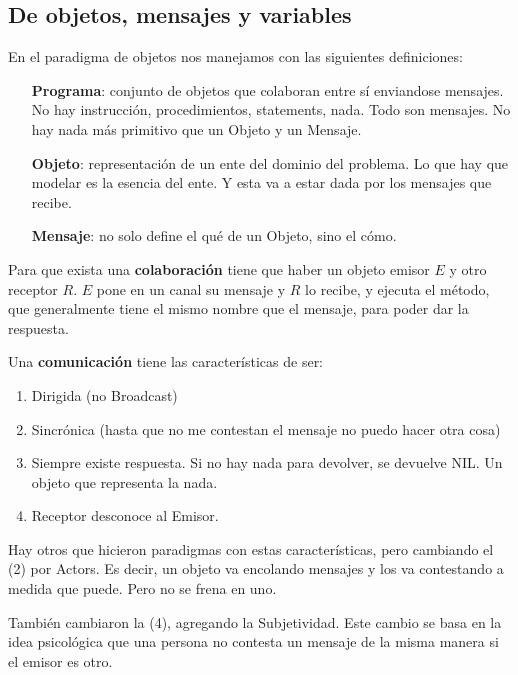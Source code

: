 
\subsection{De objetos, mensajes y variables}

En el paradigma de objetos nos manejamos con las siguientes definiciones:

\begin{itemize}
 \item[\textbf{Programa}:] conjunto de objetos que colaboran entre sí enviandose mensajes. No hay instrucción, procedimientos, statements, nada. Todo son mensajes. No hay nada más primitivo que un Objeto y un Mensaje. 

 \item[\textbf{Objeto}:] representación de un ente del dominio del problema. Lo que hay que modelar es la esencia del ente. Y esta va a estar dada por los mensajes que recibe. 
  
 \item[\textbf{Mensaje}:] no solo define el qué de un Objeto, sino el cómo. 
 
\end{itemize}

Para que exista una \textbf{colaboración} tiene que haber un objeto emisor $E$ y otro receptor $R$. $E$ pone en un canal su mensaje y $R$ lo recibe, y ejecuta el método, que generalmente tiene el mismo nombre que el mensaje, para poder dar la respuesta. 

Una \textbf{comunicación} tiene las características de ser:
\begin{enumerate}\itemsep-0.3em
\item Dirigida (no Broadcast)
\item Sincrónica (hasta que no me contestan el mensaje no puedo hacer otra cosa) 
\item Siempre existe respuesta. Si no hay nada para devolver, se devuelve NIL. Un objeto que representa la nada. 
\item Receptor desconoce al Emisor. 
\end{enumerate}

Hay otros que hicieron paradigmas con estas características, pero cambiando el (2) por Actors. Es decir, un objeto va encolando mensajes y los va contestando a medida que puede. Pero no se frena en uno. 

También cambiaron la (4), agregando la Subjetividad. Este cambio se basa en la idea psicológica que una persona no contesta un mensaje de la misma manera si el emisor es otro. 

